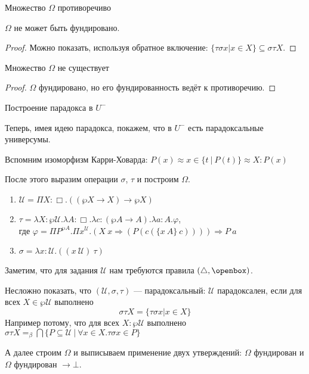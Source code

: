 \documentclass[aspectratio=169,dvipsnames,usenames]{beamer}
\begin{document}
\begin{frame}{Множество $\Omega$ противоречиво}
\begin{lmm} $\Omega$ не может быть фундировано. \end{lmm}
\begin{proof} Можно показать, используя обратное включение: $\{\tau\sigma x| x \in X\} \subseteq \sigma\tau X$.\end{proof}

\begin{thm}Множество $\Omega$ не существует\end{thm}
\begin{proof}$\Omega$ фундировано, но его фундированность ведёт к противоречию.\end{proof}
\end{frame}

\begin{frame}{Построение парадокса в $U^-$}

Теперь, имея идею парадокса, покажем, что в $U^-$ есть парадоксальные универсумы.

Вспомним изоморфизм Карри-Ховарда: $P(x) \approx x \in \{ t\ |\ P(t)\} \approx X : P(x)$

После этого выразим операции $\sigma$, $\tau$ и построим $\Omega$.

\begin{enumerate}
\item $\mathcal{U} = \Pi X : \Box . ((\wp X \rightarrow X) \rightarrow \wp X)$
\item $\tau = \lambda X : \wp\mathcal{U}. \lambda A : \Box.\lambda c : (\wp A \rightarrow A).\lambda a : A.\varphi$,\\
где
 $\varphi = \Pi P^{\wp A}.\Pi x^\mathcal{U}.(X\ x\Rightarrow (P (c (\{x\ A\}\ c)))) \Rightarrow P\ a$

\item $\sigma = \lambda x : \mathcal{U} . ((x\ \mathcal{U})\ \tau)$
\end{enumerate}

Заметим, что для задания $\mathcal{U}$ нам требуются правила $(\triangle,\openbox)$.

Несложно показать, что $(\mathcal{U},\sigma,\tau)$ --- парадоксальный:
$\mathcal{U}$ парадоксален, если для всех $X \in \wp\mathcal{U}$ выполнено $$\sigma\tau X = \{\tau\sigma x | x \in X \}$$
Например потому, что для всех $X: \wp \mathcal{U}$ выполнено $\sigma\tau X =_\beta \bigcap \{ P \subseteq \mathcal{U}\ |\ \forall x \in X.\tau\sigma x \in P \}$

А далее строим $\Omega$ и выписываем применение двух утверждений:
$\Omega$ фундирован и $\Omega$ фундирован $\rightarrow \bot$.
\end{frame}
\end{document}
